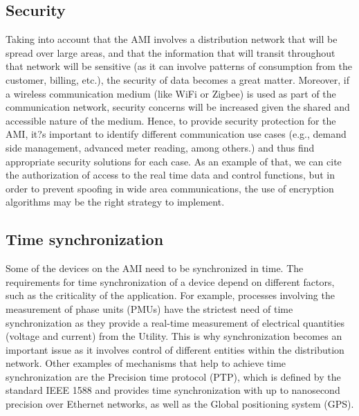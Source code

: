 \documentclass[11pt,final,onecolumn]{IEEEtran}
\begin{document}
\subsection{Security}
Taking into account that the AMI involves a distribution network that will be spread over large areas, and that the information that will transit throughout that network will be sensitive (as it can involve patterns of consumption from the customer, billing, etc.), the security of data becomes a great matter. Moreover, if a wireless communication medium (like WiFi or Zigbee) is used as part of the communication network, security concerns will be increased given the shared and accessible nature of the medium. Hence, to provide security protection for the AMI, it?s important to identify different communication use cases (e.g., demand side management, advanced meter reading, among others.) and thus find appropriate security solutions for each case. As an example of that, we can cite the authorization of access to the real time data and control functions, but in order to prevent spoofing in wide area communications, the use of encryption algorithms may be the right strategy to implement.

\subsection{Time synchronization}
Some of the devices on the AMI need to be synchronized in time. The requirements for time synchronization of a device depend on different factors, such as the criticality of the application. For example, processes involving the measurement of phase units (PMUs) have the strictest need of time synchronization as they provide a real-time measurement of electrical quantities (voltage and current) from the Utility. This is why synchronization becomes an important issue as it involves control of different entities within the distribution network. Other examples of mechanisms that help to achieve time synchronization are the Precision time protocol (PTP), which is defined by the standard IEEE 1588 and provides time synchronization with up to nanosecond precision over Ethernet networks, as well as the Global positioning system (GPS).
\end{document}
